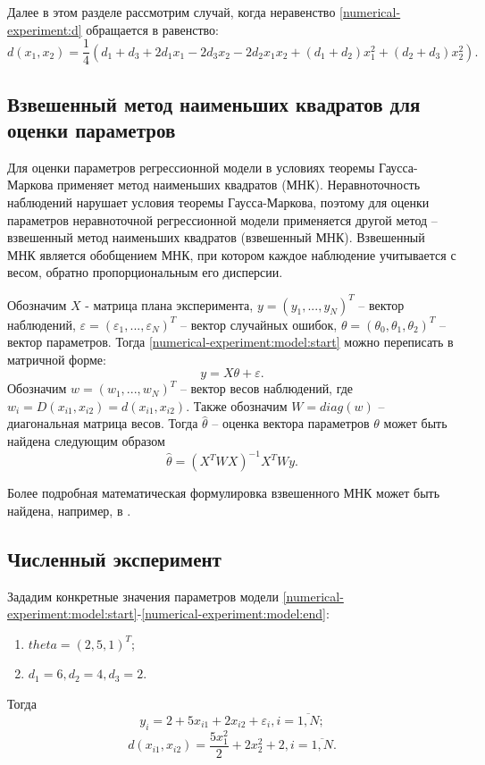 Далее в этом разделе рассмотрим случай, когда неравенство \ref{numerical-experiment:d} обращается в равенство:
\begin{equation}\label{numerical-experiment:d}
d(x_1, x_2) = \frac 1 4 (d_1 + d_3 + 2 d_1 x_1 - 2 d_3 x_2 - 2d_2 x_1 x_2 + (d_1 + d_2)x_1^2 + (d_2 + d_3)x_2^2).
\end{equation}

\subsection {Взвешенный метод наименьших квадратов для оценки параметров}
Для оценки параметров регрессионной модели в условиях теоремы Гаусса-Маркова применяет метод наименьших квадратов (МНК). Неравноточность наблюдений нарушает условия теоремы Гаусса-Маркова, поэтому для оценки параметров неравноточной регрессионной модели применяется другой метод -- взвешенный метод наименьших квадратов (взвешенный МНК). Взвешенный МНК является обобщением МНК, при котором каждое наблюдение учитывается с весом, обратно пропорциональным его дисперсии. 

Обозначим $X$ - матрица плана эксперимента, $y = (y_1, ..., y_N)^T$ -- вектор наблюдений, $\varepsilon = (\varepsilon_1, ..., \varepsilon_N)^T$ -- вектор случайных ошибок, $\theta = (\theta_0, \theta_1, \theta_2)^T$ -- вектор параметров. Тогда \eqref{numerical-experiment:model:start} можно переписать в матричной форме:
\begin{equation}
y = X\theta + \varepsilon.
\end{equation}
Обозначим $w = (w_1, ..., w_N)^T$ -- вектор весов наблюдений, где $w_i = D(x_{i1}, x_{i2}) = d(x_{i1}, x_{i2})$. Также обозначим $W = diag(w)$ -- диагональная матрица весов.
Тогда $\hat \theta$ -- оценка вектора параметров $\theta$ может быть найдена следующим образом
\begin{equation}
\hat \theta = (X^T W X)^{-1} X^T W y.
\end{equation}

Более подробная математическая формулировка взвешенного МНК может быть найдена, например, в \cite{aivazian}.

\subsection{Численный эксперимент}

Зададим конкретные значения параметров модели \eqref{numerical-experiment:model:start}-\eqref{numerical-experiment:model:end}:
\begin{enumerate}
	\item $theta = (2, 5, 1)^T$;
	\item $d_1 = 6, d_2 = 4, d_3 = 2$.
\end{enumerate} 
Тогда 
$$y_i = 2 + 5 x_{i1} + 2 x_{i2} + \varepsilon_i, i=\overline{1, N};$$
$$d(x_{i1}, x_{i2}) = \frac{5 x_{1}^{2}}{2} + 2 x_{2}^{2} + 2, i=\overline{1, N}.$$

